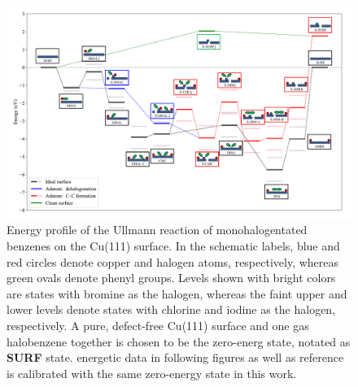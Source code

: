 \documentclass[%
 reprint,
 amsmath,amssymb,
 aps,
prb,
floatfix,
]{revtex4-2}
\begin{document}

\begin{figure}[hbt]
\centering
\includegraphics[width=1.\textwidth]{Fig/main-profile.pdf}
\caption{Energy profile of the Ullmann reaction of monohalogentated benzenes on the Cu(111) surface. In the schematic labels, blue and red circles denote copper and halogen atoms, respectively, whereas green ovals denote phenyl groups. Levels shown with bright colors are states with bromine as the halogen, whereas the faint upper and lower levels denote states with chlorine and iodine as the halogen, respectively. A pure, defect-free Cu(111) surface and one gas halobenzene together is chosen to be the zero-energ state, notated as \textbf{SURF} state. energetic data in following figures as well as reference is calibrated with the same zero-energy state in this work.}
\label{fig:completeenergy}
\end{figure}
\end{document}

